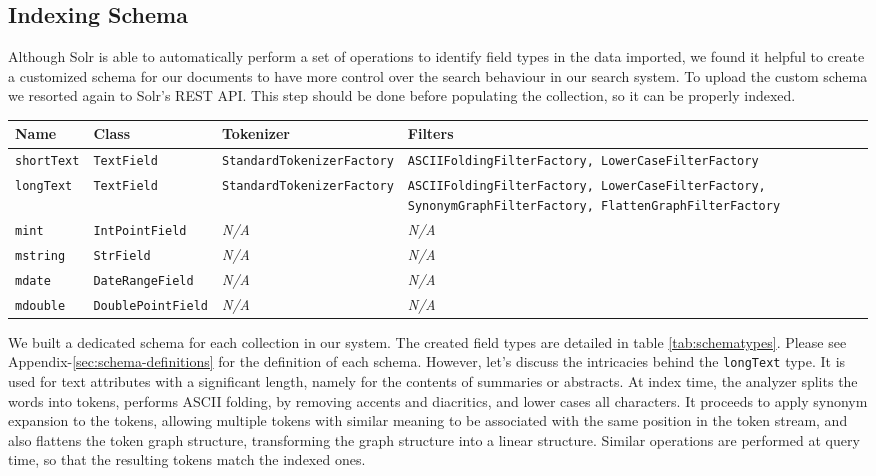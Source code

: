 \subsection{Indexing Schema}

Although Solr is able to automatically perform a set of operations to identify field types in the data imported, we found it helpful to create a customized schema for our documents to have more control over the search behaviour in our search system. To upload the custom schema we resorted again to Solr's REST API. This step should be done before populating the collection, so it can be properly indexed.


\begin{table*}
  \caption{Schema Types}
  \label{tab:schematypes}
  \begin{tabular}{lllp{2in}}
    \toprule
    Name&Class&Tokenizer&Filters\\
    \midrule
    \texttt{shortText}& \texttt{TextField}& \texttt{StandardTokenizerFactory}& \texttt{ASCIIFoldingFilterFactory, LowerCaseFilterFactory}\\
    \texttt{longText}& \texttt{TextField}& \texttt{StandardTokenizerFactory}& \texttt{ASCIIFoldingFilterFactory, LowerCaseFilterFactory, SynonymGraphFilterFactory, FlattenGraphFilterFactory}\\
    \texttt{mint}& \texttt{IntPointField}& \textit{N/A}& \textit{N/A}\\
    \texttt{mstring}& \texttt{StrField}& \textit{N/A}& \textit{N/A}\\
    \texttt{mdate}& \texttt{DateRangeField}& \textit{N/A}& \textit{N/A}\\
    \texttt{mdouble}& \texttt{DoublePointField}& \textit{N/A}& \textit{N/A}\\
    \bottomrule
  \end{tabular}
\end{table*}

We built a dedicated schema for each collection in our system. The created field types are detailed in table \ref{tab:schematypes}. Please see Appendix-\ref{sec:schema-definitions} for the definition of each schema. However, let's discuss the intricacies behind the \texttt{longText} type. It is used for text attributes with a significant length, namely for the contents of summaries or abstracts. At index time, the analyzer splits the words into tokens, performs ASCII folding, by removing accents and diacritics, and lower cases all characters. It proceeds to apply synonym expansion to the tokens, allowing multiple tokens with similar meaning to be associated with the same position in the token stream, and also flattens the token graph structure, transforming the graph structure into a linear structure. Similar operations are performed at query time, so that the resulting tokens match the indexed ones.

